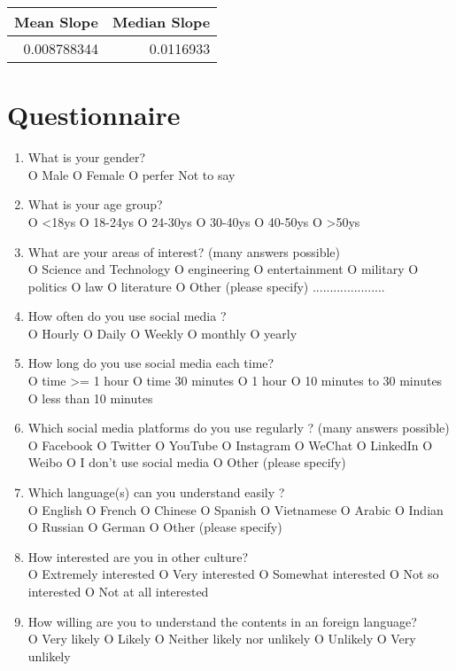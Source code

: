 \documentclass[conference]{IEEEtran}
\begin{document}
\begin{tabular}{rr}
  \hline
  Mean Slope & Median Slope \\
  \hline
  0.008788344 & 0.0116933 \\
  \hline
\end{tabular}
\section{Questionnaire}
\begin{enumerate}
\item What is your gender? \\
  O Male O Female O perfer Not to say
\item What is your age group? \\
  O <18ys O 18-24ys O 24-30ys O 30-40ys O 40-50ys O >50ys
\item What are your areas of interest? (many answers possible) \\
  O Science and Technology O engineering O entertainment O military O politics O
  law O literature O Other (please specify) .....................
\item How often do you use social media ?\\
  O Hourly O Daily O Weekly O monthly O yearly
\item How long do you use social media each time? \\
  O time >= 1 hour O time 30 minutes O 1 hour O 10 minutes to 30 minutes O less than 10 minutes
\item Which social media platforms do you use regularly ? (many answers possible)\\
  O Facebook O Twitter O YouTube O Instagram O WeChat O LinkedIn O Weibo O I
  don't use social media O Other (please specify)
\item Which language(s) can you understand easily ?\\
  O English O French O Chinese O Spanish O Vietnamese O Arabic O Indian O
  Russian O German O Other (please specify)
\item How interested are you in other culture? \\
  O Extremely interested O Very interested O Somewhat interested O Not so
  interested O Not at all interested
\item How willing are you to understand the contents in an foreign language?\\
  O Very likely O Likely O Neither likely nor unlikely O Unlikely O Very
  unlikely




\end{enumerate}
\end{document}
